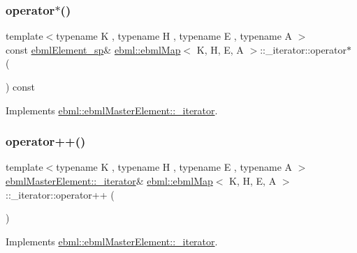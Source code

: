 \subsubsection{\texorpdfstring{operator$\ast$()}{operator*()}}
{\footnotesize\ttfamily template$<$typename K , typename H , typename E , typename A $>$ \\
const \mbox{\hyperlink{namespaceebml_adad533b7705a16bb360fe56380c5e7be}{ebml\+Element\+\_\+sp}}\& \mbox{\hyperlink{classebml_1_1ebmlMap}{ebml\+::ebml\+Map}}$<$ K, H, E, A $>$\+::\+\_\+iterator\+::operator$\ast$ (\begin{DoxyParamCaption}{ }\end{DoxyParamCaption}) const\hspace{0.3cm}{\ttfamily [virtual]}}



Implements \mbox{\hyperlink{classebml_1_1ebmlMasterElement_1_1__iterator_a3275ab5cdba37d79dd323879598f4f5d}{ebml\+::ebml\+Master\+Element\+::\+\_\+iterator}}.

\mbox{\label{classebml_1_1ebmlMap_1_1__iterator_aa35aad1b71670402a6152989c9b0cf6b}} 
\subsubsection{\texorpdfstring{operator++()}{operator++()}}
{\footnotesize\ttfamily template$<$typename K , typename H , typename E , typename A $>$ \\
\mbox{\hyperlink{classebml_1_1ebmlMasterElement_1_1__iterator}{ebml\+Master\+Element\+::\+\_\+iterator}}\& \mbox{\hyperlink{classebml_1_1ebmlMap}{ebml\+::ebml\+Map}}$<$ K, H, E, A $>$\+::\+\_\+iterator\+::operator++ (\begin{DoxyParamCaption}{ }\end{DoxyParamCaption})\hspace{0.3cm}{\ttfamily [virtual]}}



Implements \mbox{\hyperlink{classebml_1_1ebmlMasterElement_1_1__iterator_ab77210fd0e481e1bb5b8563f7bd8142b}{ebml\+::ebml\+Master\+Element\+::\+\_\+iterator}}.

\mbox{\label{classebml_1_1ebmlMap_1_1__iterator_af9aa2621f2b2d78c75a473b3c4b94fc4}} 
